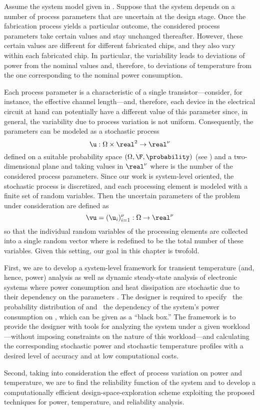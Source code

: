 Assume the system model given in . Suppose that the system
depends on a number of process parameters that are uncertain at the design
stage. Once the fabrication process yields a particular outcome, the considered
process parameters take certain values and stay unchanged thereafter. However,
these certain values are different for different fabricated chips, and they also
vary within each fabricated chip. In particular, the variability leads to
deviations of power from the nominal values and, therefore, to deviations of
temperature from the one corresponding to the nominal power consumption.

Each process parameter is a characteristic of a single transistor---consider,
for instance, the effective channel length---and, therefore, each device in the
electrical circuit at hand can potentially have a different value of this
parameter since, in general, the variability due to process variation is not
uniform. Consequently, the parameters can be modeled as a stochastic process
\[
  \u: \Omega \times \real^2 \to \real^\nu
\]
defined on a suitable probability space $(\Omega, \F, \probability)$ (see
) and a two-dimensional plane and taking values in
$\real^\nu$ where \nu is the number of the considered process parameters. Since
our work is system-level oriented, the stochastic process is discretized, and
each processing element is modeled with a finite set of random variables. Then
the uncertain parameters of the problem under consideration are defined as
\[
  \vu = (\u_i)_{i = 1}^\nu: \Omega \to \real^\nu
\]
so that the individual random variables of the processing elements are collected
into a single random vector where \nu is redefined to be the total number of
these variables. Given this setting, our goal in this chapter is twofold.

First, we are to develop a system-level framework for transient temperature
(and, hence, power) analysis as well as dynamic steady-state analysis of
electronic systems where power consumption and heat dissipation are stochastic
due to their dependency on the parameters \vu. The designer is required to
specify \one~the probability distribution of \vu and \two~the dependency of the
system's power consumption on \vu, which can be given as a ``black box.'' The
framework is to provide the designer with tools for analyzing the system under a
given workload---without imposing constraints on the nature of this
workload---and calculating the corresponding stochastic power \mp and stochastic
temperature \mq profiles with a desired level of accuracy and at low
computational costs.

Second, taking into consideration the effect of process variation on power and
temperature, we are to find the reliability function of the system and to
develop a computationally efficient design-space-exploration scheme exploiting
the proposed techniques for power, temperature, and reliability analysis.
